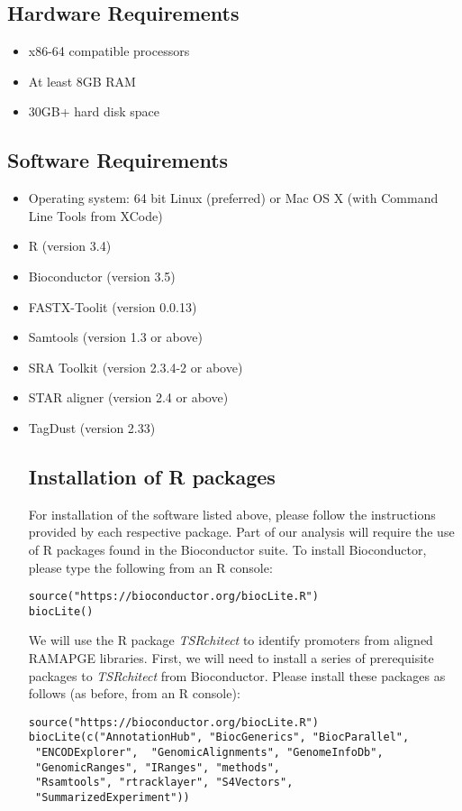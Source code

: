 \documentclass[runningheads,a4paper]{llncs}
\begin{document}
\begin{linenumbers}
\subsection{Hardware Requirements}
\begin{itemize} 
\item x86-64 compatible processors
\item At least 8GB RAM
\item 30GB+ hard disk space
\end{itemize}

\subsection{Software Requirements}
\begin{itemize}
\item Operating system: 64 bit Linux (preferred) or Mac OS X (with Command Line Tools from XCode)
\item R (version 3.4) 
\item Bioconductor (version 3.5)
\item FASTX-Toolit (version 0.0.13)
\item Samtools (version 1.3 or above)
\item SRA Toolkit (version 2.3.4-2 or above)
\item STAR aligner (version 2.4 or above)
\item TagDust (version 2.33)

\subsection{Installation of R packages}
For installation of the software listed above, please follow the instructions provided by each respective package. 
Part of our analysis will require the use of R packages found in the Bioconductor suite.
To install Bioconductor, please type the following from an R console: 

\begin{lstlisting}
source("https://bioconductor.org/biocLite.R")
biocLite()
\end{lstlisting}

We will use the R package \textit{TSRchitect} to identify promoters from aligned RAMAPGE libraries. 
First, we will need to install a series of prerequisite packages to \textit{TSRchitect} from Bioconductor.
Please install these packages as follows (as before, from an R console):

\begin{lstlisting}
source("https://bioconductor.org/biocLite.R")
biocLite(c("AnnotationHub", "BiocGenerics", "BiocParallel",
 "ENCODExplorer",  "GenomicAlignments", "GenomeInfoDb",
 "GenomicRanges", "IRanges", "methods", 
 "Rsamtools", "rtracklayer", "S4Vectors",
 "SummarizedExperiment"))
\end{lstlisting}


\end{itemize}
\end{linenumbers}
\end{document}
